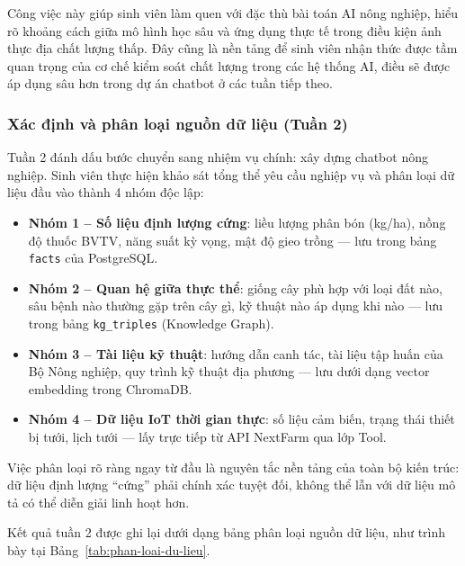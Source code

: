 Công việc này giúp sinh viên làm quen với đặc thù bài toán AI nông nghiệp, hiểu rõ khoảng cách giữa mô hình học sâu và ứng dụng thực tế trong điều kiện ảnh thực địa chất lượng thấp. Đây cũng là nền tảng để sinh viên nhận thức được tầm quan trọng của cơ chế kiểm soát chất lượng trong các hệ thống AI, điều sẽ được áp dụng sâu hơn trong dự án chatbot ở các tuần tiếp theo.

\subsubsection{Xác định và phân loại nguồn dữ liệu (Tuần 2)}

Tuần 2 đánh dấu bước chuyển sang nhiệm vụ chính: xây dựng chatbot nông nghiệp. Sinh viên thực hiện khảo sát tổng thể yêu cầu nghiệp vụ và phân loại dữ liệu đầu vào thành 4 nhóm độc lập:

\begin{itemize}
    \item \textbf{Nhóm 1 -- Số liệu định lượng cứng}: liều lượng phân bón (kg/ha), nồng độ thuốc BVTV, năng suất kỳ vọng, mật độ gieo trồng --- lưu trong bảng \texttt{facts} của PostgreSQL.
    \item \textbf{Nhóm 2 -- Quan hệ giữa thực thể}: giống cây phù hợp với loại đất nào, sâu bệnh nào thường gặp trên cây gì, kỹ thuật nào áp dụng khi nào --- lưu trong bảng \texttt{kg\_triples} (Knowledge Graph).
    \item \textbf{Nhóm 3 -- Tài liệu kỹ thuật}: hướng dẫn canh tác, tài liệu tập huấn của Bộ Nông nghiệp, quy trình kỹ thuật địa phương --- lưu dưới dạng vector embedding trong ChromaDB.
    \item \textbf{Nhóm 4 -- Dữ liệu IoT thời gian thực}: số liệu cảm biến, trạng thái thiết bị tưới, lịch tưới --- lấy trực tiếp từ API NextFarm qua lớp Tool.
\end{itemize}

Việc phân loại rõ ràng ngay từ đầu là nguyên tắc nền tảng của toàn bộ kiến trúc: dữ liệu định lượng ``cứng'' phải chính xác tuyệt đối, không thể lẫn với dữ liệu mô tả có thể diễn giải linh hoạt hơn.

Kết quả tuần 2 được ghi lại dưới dạng bảng phân loại nguồn dữ liệu, như trình bày tại Bảng~\ref{tab:phan-loai-du-lieu}.

